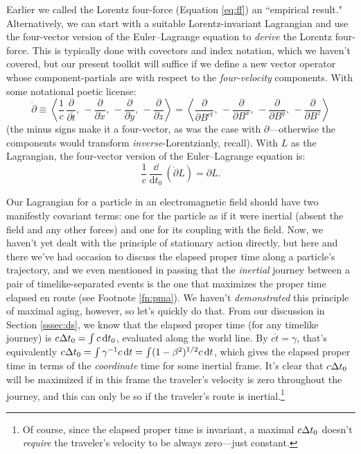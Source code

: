 \documentclass[12pt]{article}
\newcommand{\dd}[1]{\mathrm{d}#1}
\begin{document}
Earlier we called the Lorentz four-force (Equation \ref{eq:ff}) an ``empirical result." Alternatively, we can start with a suitable Lorentz-invariant Lagrangian and use the four-vector version of the Euler--Lagrange equation to \emph{derive} the Lorentz four-force. This is typically done with covectors and index notation, which we haven't covered, but our present toolkit will suffice if we define a new vector operator whose component-partials are with respect to the \emph{four-velocity} components. With some notational poetic license:
\begin{equation*}
\mathring{\partialup} \equiv \left \langle \dfrac{1}{c} \, \dfrac{\partial}{\partial \mathring{t}} , \,  - \dfrac{\partial}{\partial \mathring{x}} , \, - \dfrac{\partial}{\partial \mathring{y}} , \, - \dfrac{\partial}{\partial \mathring{z}} \right \rangle = \left \langle \dfrac{\partial}{\partial B^{ct}} , \,  - \dfrac{\partial}{\partial B^x} , \, - \dfrac{\partial}{\partial B^y} , \, - \dfrac{\partial}{\partial B^z} \right \rangle
\end{equation*}
(the minus signs make it a four-vector, as was the case with $\partialup$---otherwise the components would transform \emph{inverse}-Lorentzianly, recall). With $L$ as the Lagrangian, the four-vector version of the Euler--Lagrange equation is:
\begin{equation}\label{eq:ele}
\dfrac{1}{c} \, \dfrac{\dd}{\dd t_0} \, ( \mathring{\partialup} L ) = \partialup L .
\end{equation}

Our Lagrangian for a particle in an electromagnetic field should have two manifestly covariant terms: one for the particle as if it were inertial (absent the field and any other forces) and one for its coupling with the field. Now, we haven't yet dealt with the principle of stationary action directly, but here and there we've had occasion to discuss the elapsed proper time along a particle's trajectory, and we even mentioned in passing that the \emph{inertial} journey between a pair of timelike-separated events is the one that maximizes the proper time elapsed en route (see Footnote \ref{fn:pma}). We haven't \emph{demonstrated} this principle of maximal aging, however, so let's quickly do that. From our discussion in Section \ref{sssec:ds}, we know that the elapsed proper time (for any timelike journey) is $c \mkern.5mu \Delta t_0 = \int c \, \dd t_0$, evaluated along the world line. By $c\mathring{t} = \gamma$, that's equivalently $c \mkern.5mu \Delta t_0 = \int \gamma^{-1} c \, \dd t = \int (1 - \beta^2)^{1/2} c \, \dd t $, which gives the elapsed proper time in terms of the \emph{coordinate} time for some inertial frame. It's clear that $c \mkern.5mu \Delta t_0$ will be maximized if in this frame the traveler's velocity is zero throughout the journey, and this can only be so if the traveler's route is inertial.\footnote{Of course, since the elapsed proper time is invariant, a maximal $c \mkern.5mu \Delta t_0$ doesn't \emph{require} the traveler's velocity to be always zero---just constant.}
\end{document}
